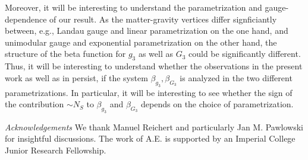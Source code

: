 \documentclass[twocolumn,prd,superscriptaddress,preprintnumbers,amsmath,amssymb,nofootinbib]{revtex4}
\begin{document}
 Moreover, it will be interesting to understand the parametrization and gauge-dependence of our result. As the matter-gravity vertices differ signficiantly between, e.g., Landau gauge and linear parametrization on the one hand, and unimodular gauge and exponential parametrization on the other hand, the structure of the beta function for $g_3$ as well as $G_3$ could be significantly different. Thus, it will be interesting to understand whether the observations in the present work as well as in \cite{Meibohm:2015twa} persist, if the system $\beta_{g_3}, \beta_{G_3}$ is analyzed in the two different parametrizations. In particular, it will be interesting to see whether the sign of the contribution $\sim N_S$ to $\beta_{g_3}$ and $\beta_{G_3}$ depends on the choice of parametrization.

%
\emph{Acknowledgements}
We thank Manuel Reichert and particularly Jan M. Pawlowski for insightful discussions. The work of A.E. is supported by an Imperial College Junior Research Fellowship.
\end{document}

